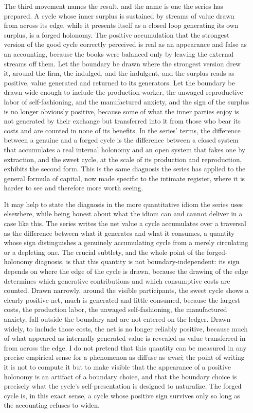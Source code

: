 \documentclass[11pt,a4paper]{article}
\begin{document}
The third movement names the result, and the name is one the series has prepared. A cycle whose inner surplus is sustained by streams of value drawn from across its edge, while it presents itself as a closed loop generating its own surplus, is a forged holonomy. The positive accumulation that the strongest version of the good cycle correctly perceived is real as an appearance and false as an accounting, because the books were balanced only by leaving the external streams off them. Let the boundary be drawn where the strongest version drew it, around the firm, the indulged, and the indulgent, and the surplus reads as positive, value generated and returned to its generators. Let the boundary be drawn wide enough to include the production worker, the unwaged reproductive labor of self-fashioning, and the manufactured anxiety, and the sign of the surplus is no longer obviously positive, because some of what the inner parties enjoy is not generated by their exchange but transferred into it from those who bear its costs and are counted in none of its benefits. In the series' terms, the difference between a genuine and a forged cycle is the difference between a closed system that accumulates a real internal holonomy and an open system that fakes one by extraction, and the sweet cycle, at the scale of its production and reproduction, exhibits the second form. This is the same diagnosis the series has applied to the general formula of capital, now made specific to the intimate register, where it is harder to see and therefore more worth seeing.

It may help to state the diagnosis in the more quantitative idiom the series uses elsewhere, while being honest about what the idiom can and cannot deliver in a case like this. The series writes the net value a cycle accumulates over a traversal as the difference between what it generates and what it consumes, a quantity whose sign distinguishes a genuinely accumulating cycle from a merely circulating or a depleting one. The crucial subtlety, and the whole point of the forged-holonomy diagnosis, is that this quantity is not boundary-independent: its sign depends on where the edge of the cycle is drawn, because the drawing of the edge determines which generative contributions and which consumptive costs are counted. Drawn narrowly, around the visible participants, the sweet cycle shows a clearly positive net, much is generated and little consumed, because the largest costs, the production labor, the unwaged self-fashioning, the manufactured anxiety, fall outside the boundary and are not entered on the ledger. Drawn widely, to include those costs, the net is no longer reliably positive, because much of what appeared as internally generated value is revealed as value transferred in from across the edge. I do not pretend that this quantity can be measured in any precise empirical sense for a phenomenon as diffuse as \textit{amai}; the point of writing it is not to compute it but to make visible that the appearance of a positive holonomy is an artifact of a boundary choice, and that the boundary choice is precisely what the cycle's self-presentation is designed to naturalize. The forged cycle is, in this exact sense, a cycle whose positive sign survives only so long as the accounting refuses to widen.
\end{document}
